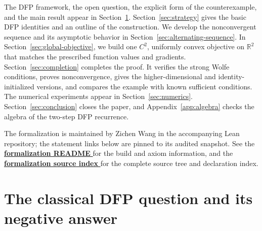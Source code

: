 \documentclass[11pt]{article}
\newcommand{\R}{\mathbb R}
\newcommand{\leanLinkText}[1]{%
  \underline{\textbf{#1}}%
}
\newcommand{\leanSnapshot}{e308927f5b7930bdd002f0c0e42b9d112ad821cb}
\newcommand{\leanFormalizationReadme}{%
  \href{https://github.com/imathwy/DFP_wolfe_local/blob/\leanSnapshot/README.md}%
    {\leanLinkText{formalization README}}%
}
\newcommand{\leanDependencyMap}{%
  \href{https://github.com/imathwy/DFP_wolfe_local}%
    {\leanLinkText{formalization source index}}%
}
\begin{document}
The DFP framework, the open question, the explicit form of the counterexample,
and the main result appear in Section~\ref{sec:statement}.
Section~\ref{sec:strategy} gives the basic DFP identities and an outline of
the construction.  We develop the nonconvergent sequence and its asymptotic behavior in
Section~\ref{sec:alternating-sequence}.  In
Section~\ref{sec:global-objective}, we build one $C^2$, uniformly convex
objective on $\R^2$ that matches the prescribed function values and gradients.
Section~\ref{sec:completion} completes the
proof.  It verifies the strong Wolfe conditions, proves nonconvergence, gives
the higher-dimensional and identity-initialized versions, and compares the
example with known sufficient conditions.  The numerical experiments appear
in Section~\ref{sec:numerics}.  Section~\ref{sec:conclusion} closes the paper,
and Appendix~\ref{app:algebra} checks the algebra of the two-step DFP
recurrence.

The formalization is maintained by Zichen Wang in the accompanying Lean
repository; the statement links below are pinned to its audited snapshot.
See the \leanFormalizationReadme{} for the build and axiom information, and
the \leanDependencyMap{} for the complete source tree and declaration index.

\section{The classical DFP question and its negative answer}
\label{sec:statement}
\end{document}

